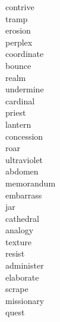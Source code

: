 \documentclass[a4paper, 11pt]{ctexart}
\begin{document}
\begin{multicols*}{3}
\begin{description}
\item[contrive]

\item[tramp]

\item[erosion]

\item[perplex]

\item[coordinate]

\item[bounce]

\item[realm]

\item[undermine]

\item[cardinal]

\item[priest]

\item[lantern]

\item[concession]

\item[roar]

\item[ultraviolet]

\item[abdomen]

\item[memorandum]

\item[embarrass]

\item[jar]

\item[cathedral]

\item[analogy]

\item[texture]

\item[resist]

\item[administer]

\item[elaborate]

\item[scrape]

\item[missionary]

\item[quest]


\end{description}
\end{multicols*}
\end{document}
